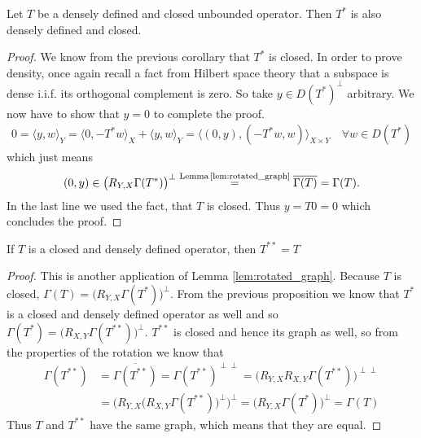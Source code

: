 \documentclass[../master_thesis.tex]{subfiles}
\begin{document}
\begin{proposition}\label{prop:adjoint_of_densely_defined_closed}
    Let $T$ be a densely defined and closed unbounded operator.
    Then $T^*$ is also densely defined and closed.
\end{proposition}
\begin{proof}
    We know from the previous corollary that $T^*$ is closed. 
    In order to prove density, once again recall a fact from Hilbert space
    theory that a subspace is dense i.i.f. its orthogonal complement 
    is zero. So take $y \in D(T^*)^\perp$ arbitrary. We now have to show that 
    $y=0$ to complete the proof.
    \begin{align*}
        0 = \langle y, w \rangle_Y 
        = \langle 0, -T^*w \rangle _X + \langle y, w \rangle _Y
        = \langle (0,y), (-T^*w,w) \rangle _{X\times Y} \quad \forall w \in D(T^*)
    \end{align*}
    which just means
    \begin{align*}
        (0,y) \in \big(R_{Y,X}\Gamma(T^*)\big)^\perp 
        \stackrel{\text{Lemma\,\ref{lem:rotated_graph}} }{=} \overline{\Gamma(T)}
        = \Gamma(T).
    \end{align*}
    In the last line we used the fact, that $T$ is closed. 
    Thus $y = T0 = 0$ which concludes the proof.
\end{proof}

\begin{proposition}\label{prop:T_starstar_equals_T}
    If $T$ is a closed and densely defined operator, 
    then $T^{**} = T$
\end{proposition}
\begin{proof}
    This is another application of Lemma \ref{lem:rotated_graph}. 
    Because $T$ is closed, $\Gamma(T) = \big( R_{Y,X}\Gamma(T^*)\big)^\perp$. 
    From the previous proposition we know that $T^*$ is a closed and 
    densely defined operator as well and so $\Gamma(T^*) = \big( R_{X,Y}\Gamma(T^{**})\big)^\perp$.
    $T^{**}$ is closed and hence its graph as well, so
    from the properties of the rotation we know that
    \begin{align*}
        \Gamma(T^{**}) 
        &= \overline{\Gamma(T^{**})} 
        = \Gamma(T^{**})^{\perp \perp}
        = \big( R_{Y,X} R_{X,Y}\Gamma(T^{**})   \big)^{\perp \perp}
        \\ &= \Big( R_{Y,X}\big(R_{X,Y}\Gamma(T^{**})\big)^{\perp} \Big)^\perp
        = \Big( R_{Y,X} \Gamma(T^*) \Big)^\perp
        = \Gamma(T)
    \end{align*}
    Thus $T$ and $T^{**}$ have the same graph, which means that they are equal.
\end{proof}
\end{document}
